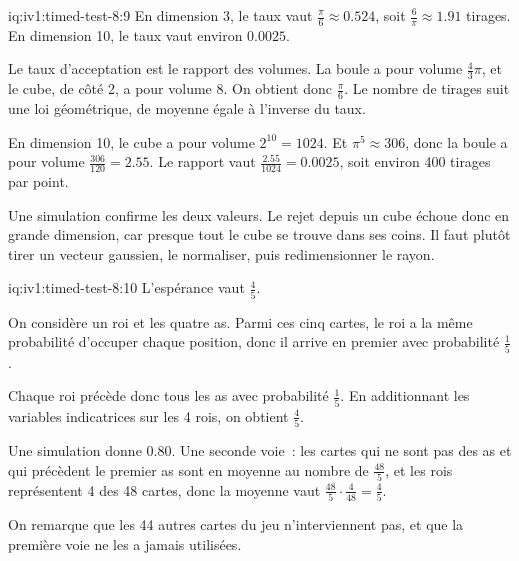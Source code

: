 \begin{solution}{iq:iv1:timed-test-8:9}
En dimension 3, le taux vaut $\frac{\pi}{6} \approx 0.524$, soit $\frac{6}{\pi} \approx 1.91$ tirages. En dimension 10, le taux vaut environ $0.0025$.

Le taux d'acceptation est le rapport des volumes. La boule a pour volume $\frac43\pi$, et le cube, de côté 2, a pour volume 8. On obtient donc $\frac{\pi}{6}$. Le nombre de tirages suit une loi géométrique, de moyenne égale à l'inverse du taux.

En dimension 10, le cube a pour volume $2^{10} = 1024$. Et $\pi^5 \approx 306$, donc la boule a pour volume $\frac{306}{120} = 2.55$. Le rapport vaut $\frac{2.55}{1024} = 0.0025$, soit environ 400 tirages par point.

Une simulation confirme les deux valeurs. Le rejet depuis un cube échoue donc en grande dimension, car presque tout le cube se trouve dans ses coins. Il faut plutôt tirer un vecteur gaussien, le normaliser, puis redimensionner le rayon.

\end{solution}

\begin{solution}{iq:iv1:timed-test-8:10}
L'espérance vaut $\frac45$.

On considère un roi et les quatre as. Parmi ces cinq cartes, le roi a la même probabilité d'occuper chaque position, donc il arrive en premier avec probabilité $\frac15$.

Chaque roi précède donc tous les as avec probabilité $\frac15$. En additionnant les variables indicatrices sur les 4 rois, on obtient $\frac45$.

Une simulation donne $0.80$. Une seconde voie~: les cartes qui ne sont pas des as et qui précèdent le premier as sont en moyenne au nombre de $\frac{48}{5}$, et les rois représentent 4 des 48 cartes, donc la moyenne vaut $\frac{48}{5} \cdot \frac{4}{48} = \frac45$.

On remarque que les 44 autres cartes du jeu n'interviennent pas, et que la première voie ne les a jamais utilisées.

\end{solution}

